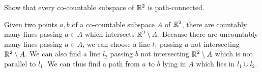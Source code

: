 \begin{prob}
    Show that every co-countable subspace of ${\mathbb{R}}^2$ is path-connected.
\end{prob}
\begin{sol}
    Given two points $a, b$ of a co-countable subspace $A$ of ${\mathbb{R}}^2$, there are countably many lines passing $a\in A$ which intersects ${\mathbb{R}}^2\setminus A$.
    Because there are uncountably many lines passing $a\in A$, we can choose a line $l_1$ passing $a$ not intersecting ${\mathbb{R}}^2\setminus A$.
    We can also find a line $l_2$ passing $b$ not intersecting ${\mathbb{R}}^2\setminus A$ which is not parallel to $l_1$.
    We can thus find a path from $a$ to $b$ lying in $A$ which lies in $l_1\cup l_2$.
\end{sol}